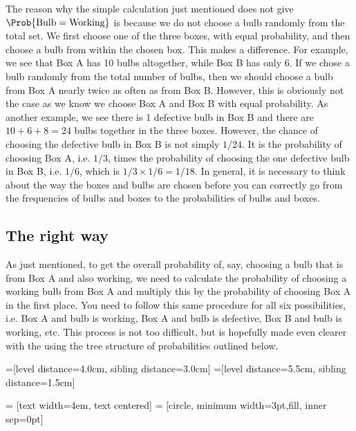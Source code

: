 \documentclass{mjandrews.notes.palatino}
\begin{document}
The reason why the simple calculation just mentioned does not give
$\Prob{\text{Bulb}=\text{Working}}$ is because we do not choose a bulb randomly
from the total set. We first choose one of the three boxes, with equal
probability, and then choose a bulb from within the chosen box. This makes a
difference. For example, we see that Box A has 10 bulbs altogether, while Box B
has only 6. If we chose a bulb randomly from the total number of bulbs, then we
should choose a bulb from Box A nearly twice as often as from Box B. However, this is
obviously not the case as we know we choose Box A and Box B with equal
probability.  As another example, we see there is 1 defective bulb in Box B and
there are $10+6+8=24$ bulbs together in the three boxes. However, the chance
of choosing the defective bulb in Box B is not simply $1/24$. It is the
probability of choosing Box A, i.e. $1/3$, times the probability of choosing
the one defective bulb in Box B, i.e. $1/6$, which is $1/3 \times 1/6 = 1/18$.
In general, it is necessary to think about the way the boxes and bulbs are
chosen before you can correctly go from the frequencies of bulbs and boxes to
the probabilities of bulbs and boxes. 

\subsection{The right way}

As just mentioned, to get the overall probability of, say, choosing a bulb that
is from Box A and also working, we need to calculate the probability of choosing
a working bulb from Box A and multiply this by the probability of choosing Box
A in the first place. You need to follow this same procedure for all six
possibilities, i.e. Box A and bulb is working, Box A and bulb is defective, Box
B and bulb is working, etc. This process is not too difficult, but is hopefully
made even clearer with the using the tree structure of probabilities outlined
below. 


=[level distance=4.0cm, sibling distance=3.0cm]
=[level distance=5.5cm, sibling distance=1.5cm]

 = [text width=4em, text centered]
 = [circle, minimum width=3pt,fill, inner sep=0pt]
\end{document}
